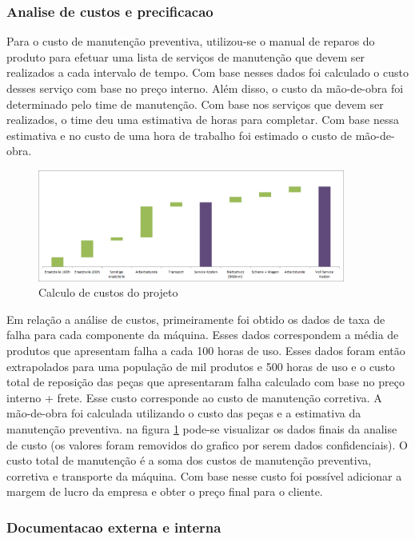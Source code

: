 \documentclass[12pt]{article}
\begin{document}
\subsubsection{Analise de custos e precificacao}

	Para o custo de manutenção preventiva, utilizou-se o manual de reparos do produto para efetuar uma lista de serviços de manutenção que devem ser realizados a cada intervalo de tempo. Com base nesses dados foi calculado o custo desses serviço com base no preço interno. Além disso, o custo da mão-de-obra foi determinado pelo time de manutenção. Com base nos serviços que devem ser realizados, o time deu uma estimativa de horas para completar. Com base nessa estimativa e no custo de uma hora de trabalho foi estimado o custo de mão-de-obra.

\begin{figure}[h!]
	\centering
	\includegraphics[width=0.9\textwidth]{img/ws220-waterfall.png}
	\caption{Calculo de custos do projeto}
	\label{fig:ws-waterfall}
\end{figure}

	Em relação a análise de custos, primeiramente foi obtido os dados de taxa de falha para cada componente da máquina. Esses dados correspondem a média de produtos que apresentam falha a cada 100 horas de uso. Esses dados foram então extrapolados para uma população de mil produtos e 500 horas de uso e o custo total de reposição das peças que apresentaram falha calculado com base no preço interno + frete. Esse custo corresponde ao custo de manutenção corretiva. A mão-de-obra foi calculada utilizando o custo das peças e a estimativa da manutenção preventiva. na figura \ref{fig:ws-waterfall} pode-se visualizar os dados finais da analise de custo (os valores foram removidos do grafico por serem dados confidenciais). O custo total de manutenção é a soma dos custos de manutenção preventiva, corretiva e transporte da máquina. Com base nesse custo foi possível adicionar a margem de lucro da empresa e obter o preço final para o cliente.
	
\subsubsection{Documentacao externa e interna}
\end{document}
